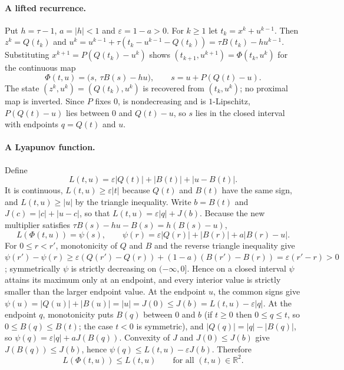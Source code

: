 \documentclass[11pt]{article}
\numberwithin{equation}{section}
\theoremstyle{definition}
\theoremstyle{remark}
\newcommand{\R}{\mathbb R}
\begin{document}
\paragraph{A lifted recurrence.} Put $h=\tau-1$, $a=\lvert h\rvert<1$ and $\varepsilon=1-a>0$. For $k\ge1$ let $t_k=x^k+u^{k-1}$. Then $z^k=Q(t_k)$ and $u^k=u^{k-1}+\tau(t_k-u^{k-1}-Q(t_k))=\tau B(t_k)-hu^{k-1}$. Substituting $x^{k+1}=P(Q(t_k)-u^k)$ shows $(t_{k+1},u^{k+1})=\Phi(t_k,u^k)$ for the continuous map
\[
\Phi(t,u)=\bigl(s,\ \tau B(s)-hu\bigr),\qquad s=u+P(Q(t)-u).
\]
The state $(z^k,u^k)=(Q(t_k),u^k)$ is recovered from $(t_k,u^k)$; no proximal map is inverted. Since $P$ fixes $0$, is nondecreasing and is $1$-Lipschitz, $P(Q(t)-u)$ lies between $0$ and $Q(t)-u$, so $s$ lies in the closed interval with endpoints $q=Q(t)$ and $u$.

\paragraph{A Lyapunov function.} Define
\[
L(t,u)=\varepsilon\lvert Q(t)\rvert+\lvert B(t)\rvert+\lvert u-B(t)\rvert .
\]
It is continuous, $L(t,u)\ge\varepsilon\lvert t\rvert$ because $Q(t)$ and $B(t)$ have the same sign, and $L(t,u)\ge\lvert u\rvert$ by the triangle inequality. Write $b=B(t)$ and $J(c)=\lvert c\rvert+\lvert u-c\rvert$, so that $L(t,u)=\varepsilon\lvert q\rvert+J(b)$. Because the new multiplier satisfies $\tau B(s)-hu-B(s)=h(B(s)-u)$,
\[
L(\Phi(t,u))=\psi(s),\qquad \psi(r)=\varepsilon\lvert Q(r)\rvert+\lvert B(r)\rvert+a\lvert B(r)-u\rvert.
\]
For $0\le r<r'$, monotonicity of $Q$ and $B$ and the reverse triangle inequality give $\psi(r')-\psi(r)\ge\varepsilon(Q(r')-Q(r))+(1-a)(B(r')-B(r))=\varepsilon(r'-r)>0$; symmetrically $\psi$ is strictly decreasing on $(-\infty,0]$. Hence on a closed interval $\psi$ attains its maximum only at an endpoint, and every interior value is strictly smaller than the larger endpoint value. At the endpoint $u$, the common signs give $\psi(u)=\lvert Q(u)\rvert+\lvert B(u)\rvert=\lvert u\rvert=J(0)\le J(b)=L(t,u)-\varepsilon\lvert q\rvert$. At the endpoint $q$, monotonicity puts $B(q)$ between $0$ and $b$ (if $t\ge0$ then $0\le q\le t$, so $0\le B(q)\le B(t)$; the case $t<0$ is symmetric), and $\lvert Q(q)\rvert=\lvert q\rvert-\lvert B(q)\rvert$, so $\psi(q)=\varepsilon\lvert q\rvert+aJ(B(q))$. Convexity of $J$ and $J(0)\le J(b)$ give $J(B(q))\le J(b)$, hence $\psi(q)\le L(t,u)-\varepsilon J(b)$. Therefore
\begin{equation}\label{eq:scalar-lyap}
L(\Phi(t,u))\le L(t,u)\qquad\text{for all }(t,u)\in\R^2 .
\end{equation}
\end{document}
